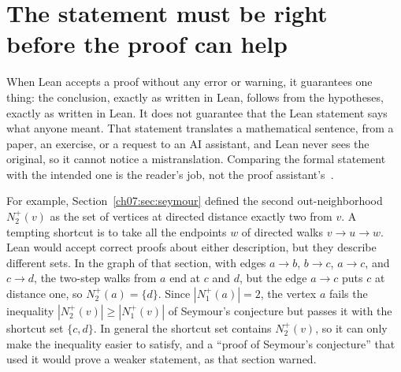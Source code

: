 \section{The statement must be right before the proof can help}\label{ch16:sec:statement}
When Lean accepts a proof without any error or warning, it guarantees one thing: the conclusion, exactly as written in Lean, follows from the hypotheses, exactly as written in Lean. It does not guarantee that the Lean statement says what anyone meant. That statement translates a mathematical sentence, from a paper, an exercise, or a request to an AI assistant, and Lean never sees the original, so it cannot notice a mistranslation. Comparing the formal statement with the intended one is the reader's job, not the proof assistant's~\cite{leanvalidate}.

For example, Section~\ref{ch07:sec:seymour} defined the second out-neighborhood $N_2^+(v)$ as the set of vertices at directed distance exactly two from $v$. A tempting shortcut is to take all the endpoints $w$ of directed walks $v\to u\to w$. Lean would accept correct proofs about either description, but they describe different sets. In the graph of that section, with edges $a\to b$, $b\to c$, $a\to c$, and $c\to d$, the two-step walks from $a$ end at $c$ and $d$, but the edge $a\to c$ puts $c$ at distance one, so $N_2^+(a)=\{d\}$. Since $|N_1^+(a)|=2$, the vertex $a$ fails the inequality $|N_2^+(v)|\ge|N_1^+(v)|$ of Seymour's conjecture but passes it with the shortcut set $\{c,d\}$. In general the shortcut set contains $N_2^+(v)$, so it can only make the inequality easier to satisfy, and a ``proof of Seymour's conjecture'' that used it would prove a weaker statement, as that section warned.

